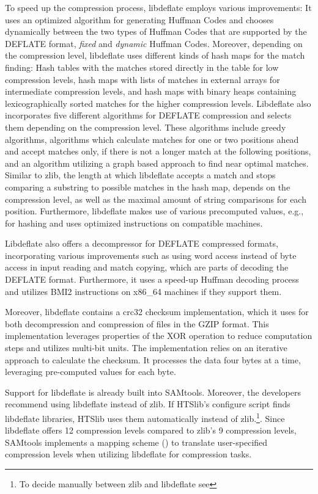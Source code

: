 To speed up the compression process, libdeflate employs various improvements: It uses an optimized algorithm for generating Huffman Codes and chooses dynamically between the two types of Huffman Codes that are supported by the DEFLATE format, \textit{fixed} and \textit{dynamic} Huffman Codes. Moreover, depending on the compression level, libdeflate uses different kinds of hash maps for the match finding: Hash tables with the matches stored directly in the table for low compression levels, hash maps with lists of matches in external arrays for intermediate compression levels, and hash maps with binary heaps containing lexicographically sorted matches for the higher compression levels. Libdeflate also incorporates five different algorithms for DEFLATE compression and selects them depending on the compression level. These algorithms include greedy algorithms, algorithms which calculate matches for one or two positions ahead and accept matches only, if there is not a longer match at the following positions, and an algorithm utilizing a graph based approach to find near optimal matches. Similar to zlib, the length at which libdeflate accepts a match and stops comparing a substring to possible matches in the hash map, depends on the compression level, as well as the maximal amount of string comparisons for each position. Furthermore, libdeflate makes use of various precomputed values, e.g., for hashing and uses optimized instructions on compatible machines.

Libdeflate also offers a decompressor for DEFLATE compressed formats, incorporating various improvements such as using word access instead of byte access in input reading and match copying, which are parts of decoding the DEFLATE format. Furthermore, it uses a speed-up Huffman decoding process and utilizes BMI2 instructions on x86\_64 machines if they support them.

Moreover, libdeflate contains a crc32 checksum implementation, which it uses for both decompression and compression of files in the GZIP format. This implementation leverages properties of the XOR operation to reduce computation steps and utilizes multi-bit units. The implementation relies on an iterative approach to calculate the checksum. It processes the data four bytes at a time, leveraging pre-computed values for each byte.

Support for libdeflate is already built into SAMtools. Moreover, the developers recommend using libdeflate instead of zlib. If HTSlib's configure script finds libdeflate libraries, HTSlib uses them automatically instead of zlib.\footnote{To decide manually between zlib and libdeflate see }. Since libdeflate offers 12 compression levels compared to zlib's 9 compression levels, SAMtools implements a mapping scheme () to translate user-specified compression levels when utilizing libdeflate for compression tasks.


